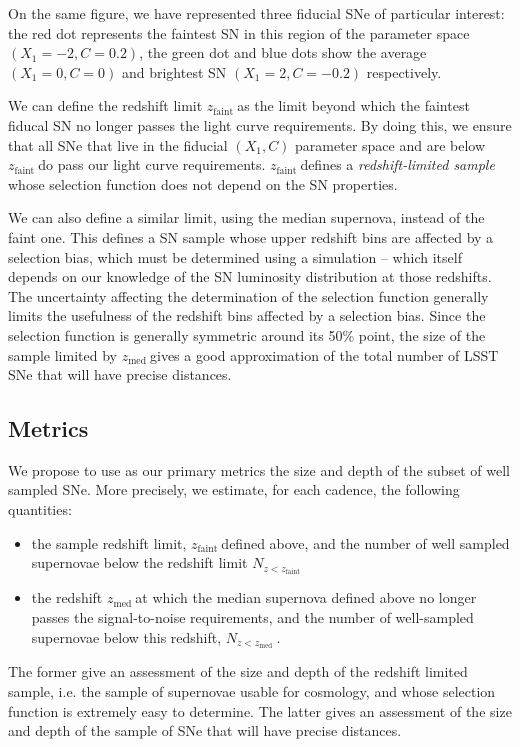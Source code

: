 \documentclass [11pt,a4paper]{article}
\newcommand{\zfaint}{$z_{\mathrm{faint}}\ $}
\newcommand{\nsnfaint}{$N_{z<z_{\mathrm{faint}}}\ $}
\newcommand{\zmed}{$z_{\mathrm{med}}\ $}
\newcommand{\nsnmed}{$N_{z<z_{\mathrm{med}}}\ $}
\begin{document}
On the same figure, we have represented three fiducial SNe of
particular interest: the red dot represents the faintest SN in this
region of the parameter space $(X_1=-2, C=0.2)$, the green dot and
blue dots show the average $(X_1=0, C=0)$ and brightest SN $(X_1=2,
C=-0.2)$ respectively.

We can define the redshift limit \zfaint as the limit beyond which the
faintest fiducal SN no longer passes the light curve requirements. By
doing this, we ensure that all SNe that live in the fiducial $(X_1,C)$
parameter space and are below \zfaint do pass our light curve
requirements.  \zfaint defines a {\em redshift-limited sample} whose
selection function does not depend on the SN properties.

We can also define a similar limit, using the median supernova,
instead of the faint one.  This defines a SN sample whose upper
redshift bins are affected by a selection bias, which must be
determined using a simulation -- which itself depends on our knowledge
of the SN luminosity distribution at those redshifts.  The uncertainty
affecting the determination of the selection function generally limits
the usefulness of the redshift bins affected by a selection bias.
Since the selection function is generally symmetric around its 50\%
point, the size of the sample limited by \zmed gives a good
approximation of the total number of LSST SNe that will have precise
distances.


\subsection{Metrics}

We propose to use as our primary metrics the size and depth of the
subset of well sampled SNe.  More precisely, we estimate, for each
cadence, the following quantities:

\begin{itemize}
\item the sample redshift limit, \zfaint defined above, and the number
  of well sampled supernovae below the redshift limit \nsnfaint
\item the redshift \zmed at which the median supernova defined above
  no longer passes the signal-to-noise requirements, and the number of
  well-sampled supernovae below this redshift, \nsnmed.  
\end{itemize}
The former give an assessment of the size and depth of the redshift
limited sample, i.e. the sample of supernovae usable for cosmology,
and whose selection function is extremely easy to determine.  The
latter gives an assessment of the size and depth of the sample of SNe
that will have precise distances.
\end{document}

